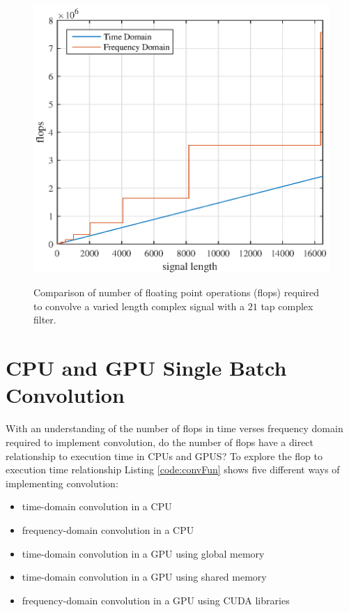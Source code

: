 \begin{figure}
	\centering\includegraphics[width=5in]{figures/gpu_intro/Theory21Tap_flops.eps}
	\label{fig:Theory21Tap_flops}
	\caption{Comparison of number of floating point operations (flops) required to convolve a varied length complex signal with a $21$ tap complex filter.}
\end{figure}



\section{CPU and GPU Single Batch Convolution}
\label{sec:cuda_convolution_single}
With an understanding of the number of flops in time verses frequency domain required to implement convolution,
do the number of flops have a direct relationship to execution time in CPUs and GPUS?
To explore the flop to execution time relationship Listing \ref{code:convFun} shows five different ways of implementing convolution:
\begin{itemize}
  \item time-domain convolution in a CPU
  \item frequency-domain convolution in a CPU
  \item time-domain convolution in a GPU using global memory
  \item time-domain convolution in a GPU using shared memory
  \item frequency-domain convolution in a GPU using CUDA libraries
\end{itemize}

